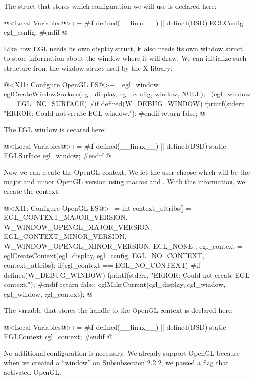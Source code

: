 The struct that stores which configuration we will use is declared
here:

\iniciocodigo
@<Local Variables@>+=
#if defined(__linux__) || defined(BSD)
EGLConfig egl_config;
#endif
@
\fimcodigo


Like how EGL needs its own display struct, it also needs its own
window struct to store information about the window where it will
draw. We can initialize such structure from the window struct used by
the X library:

\iniciocodigo
@<X11: Configure OpenGL ES@>+=
egl_window = eglCreateWindowSurface(egl_display, egl_config,
                                    window, NULL);
if(egl_window == EGL_NO_SURFACE){
#if defined(W_DEBUG_WINDOW)
  fprintf(stderr, "ERROR: Could not create EGL window.\n");
#endif
  return false;
}
@
\fimcodigo

The EGL window is decared here:

\iniciocodigo
@<Local Variables@>+=
#if defined(__linux__) || defined(BSD)
static EGLSurface egl_window;
#endif
@
\fimcodigo


Now we can create the OpenGL context. We let the user choose which
will be the major and minor OpenGL version using
macros  and
. With this information, we create the context:

\iniciocodigo
@<X11: Configure OpenGL ES@>+=
{
  int context_attribs[] = {
    EGL_CONTEXT_MAJOR_VERSION, W_WINDOW_OPENGL_MAJOR_VERSION,
    EGL_CONTEXT_MINOR_VERSION, W_WINDOW_OPENGL_MINOR_VERSION,
    EGL_NONE
  };
  egl_context = eglCreateContext(egl_display, egl_config,
                                 EGL_NO_CONTEXT, context_attribs);
  if(egl_context == EGL_NO_CONTEXT){
#if defined(W_DEBUG_WINDOW)
    fprintf(stderr, "ERROR: Could not create EGL context.\n");
#endif
    return false;
  }
  eglMakeCurrent(egl_display, egl_window, egl_window, egl_context);
}
@
\fimcodigo

The variable that stores the handle to the OpenGL context is declared
here:

\iniciocodigo
@<Local Variables@>+=
#if defined(__linux__) || defined(BSD)
static EGLContext egl_context;
#endif
@
\fimcodigo


No additional configuration is necessary. We already support OpenGL
because when we created a ``window'' on Subsubsection 2.2.2, we passed
a flag that activated OpenGL.

